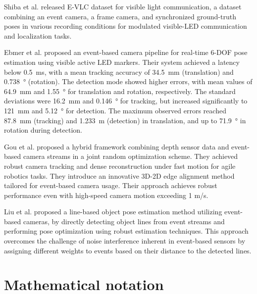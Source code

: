 Shiba et al. \cite{Shiba25cvprw} released E-VLC dataset for visible light communication, a dataset combining an event camera, a frame camera, and synchronized ground-truth poses in various recording conditions for modulated visible-\ac{LED} communication and localization tasks.

Ebmer et al. \cite{ebmer2023} proposed an event-based camera pipeline for real-time 6-\ac{DOF} pose estimation using visible active LED markers. Their system achieved a latency below \SI{0.5}{\milli\second}, with a mean tracking accuracy of \SI{34.5}{\milli\meter} (translation) and \SI{0.738}{\degree} (rotation). The detection mode showed higher errors, with mean values of \SI{64.9}{\milli\meter} and \SI{1.55}{\degree} for translation and rotation, respectively. The standard deviations were \SI{16.2}{\milli\meter} and \SI{0.146}{\degree} for tracking, but increased significantly to \SI{121}{\milli\meter} and \SI{5.12}{\degree} for detection. The maximum observed errors reached \SI{87.8}{\milli\meter} (tracking) and \SI{1.233}{\meter} (detection) in translation, and up to \SI{71.9}{\degree} in rotation during detection.

Gou et al. \cite{GOU2025328} proposed a hybrid framework combining depth sensor data and event-based camera streams in a joint random optimization scheme. They achieved robust camera tracking and dense reconstruction under fast motion for agile robotics tasks.
They introduce an innovative 3D-2D edge alignment method tailored for event-based camera usage. Their approach achieves
robust performance even with high-speed camera motion exceeding 1 m/s.

Liu et al.\cite{liu2024linebased6dofobjectpose} proposed a line-based object pose estimation method utilizing event-based cameras, 
by directly detecting object lines from event streams and performing pose optimization using robust estimation techniques.
This approach overcomes the challenge of noise interference inherent in event-based sensors by assigning different weights to events
based on their distance to the detected lines.
\section{Mathematical notation}


